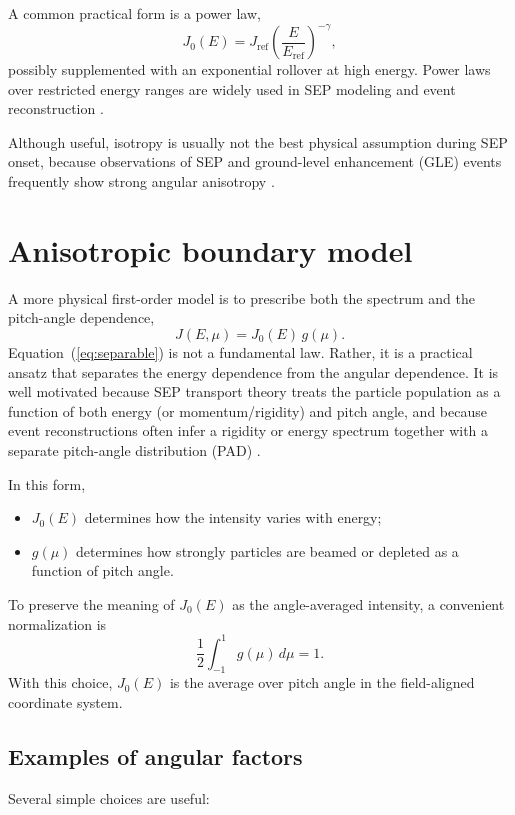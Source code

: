 \documentclass[11pt]{article}
\begin{document}
A common practical form is a power law,
\begin{equation}
J_0(E)=J_{\mathrm{ref}}\left(\frac{E}{E_{\mathrm{ref}}}\right)^{-\gamma},
\end{equation}
possibly supplemented with an exponential rollover at high energy. Power laws over restricted energy ranges are widely used in SEP modeling and event reconstruction \cite{Desai2016,Papaioannou2022}.

Although useful, isotropy is usually not the best physical assumption during SEP onset, because observations of SEP and ground-level enhancement (GLE) events frequently show strong angular anisotropy \cite{Mishev2021,Davis2024}.

\section{Anisotropic boundary model}
A more physical first-order model is to prescribe both the spectrum and the pitch-angle dependence,
\begin{equation}
J(E,\mu)=J_0(E)\,g(\mu).
\label{eq:separable}
\end{equation}
Equation~(\ref{eq:separable}) is not a fundamental law. Rather, it is a practical ansatz that separates the energy dependence from the angular dependence. It is well motivated because SEP transport theory treats the particle population as a function of both energy (or momentum/rigidity) and pitch angle, and because event reconstructions often infer a rigidity or energy spectrum together with a separate pitch-angle distribution (PAD) \cite{Kubo2015,Mishev2021,Davis2024}.

In this form,
\begin{itemize}
  \item $J_0(E)$ determines how the intensity varies with energy;
  \item $g(\mu)$ determines how strongly particles are beamed or depleted as a function of pitch angle.
\end{itemize}
To preserve the meaning of $J_0(E)$ as the angle-averaged intensity, a convenient normalization is
\begin{equation}
\frac{1}{2}\int_{-1}^{1} g(\mu)\,d\mu = 1.
\label{eq:norm}
\end{equation}
With this choice, $J_0(E)$ is the average over pitch angle in the field-aligned coordinate system.

\subsection{Examples of angular factors}
Several simple choices are useful:
\end{document}
